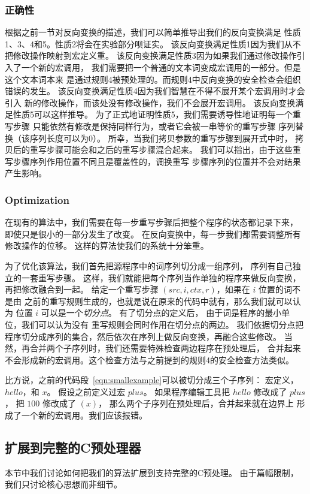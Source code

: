 \subsubsection{正确性}\label{sec:correctness}
根据之前一节对反向变换的描述，我们可以简单推导出我们的反向变换满足
性质1、3、4和5。性质2将会在实验部分呗证实。
该反向变换满足性质1因为我们从不把修改操作映射到宏定义重。
该反向变换满足性质3因为如果我们通过修改操作引入了一个新的宏调用，
我们需要把一个普通的文本词变成宏调用的一部分。但是这个文本词本来
是通过规则4被预处理的。而规则4中反向变换的安全检查会组织错误的发生。
该反向变换满足性质4因为我们智慧在不得不展开某个宏调用时才会引入
新的修改操作，而该处没有修改操作，我们不会展开宏调用。
该反向变换满足性质5可以这样推导。
为了正式地证明性质5，我们需要诱导性地证明每一个重写步骤
只能依然有修改是保持同样行为，或者它会被一串等价的重写步骤
序列替换（该序列长度可以为0）。
所幸，当我们拷贝参数的重写步骤到展开式中时，
拷贝后的重写步骤可能会和之后的重写步骤混合起来。
我们可以指出，由于这些重写步骤序列作用位置不同且是覆盖性的，调换重写
步骤序列的位置并不会对结果产生影响。

\subsubsection{Optimization}\label{sec:optimization}
在现有的算法中，我们需要在每一步重写步骤后把整个程序的状态都记录下来，
即使只是很小的一部分发生了改变。
在反向变换中，每一步我们都需要调整所有修改操作的位移。
这样的算法使我们的系统十分笨重。

为了优化该算法，我们首先把源程序中的词序列切分成一组序列，
序列有自己独立的一套重写步骤。
这样，我们就能把每个序列当作单独的程序来做反向变换，再把修改融合到一起。
给定一个重写步骤 $(src, i, ctx, r)$，如果在 $i$ 位置的词不是由
之前的重写规则生成的，也就是说在原来的代码中就有，那么我们就可以认为
位置 $i$ 可以是一个\emph{切分点}。
有了切分点的定义后， 由于词是程序的最小单位，我们可以认为没有
重写规则会同时作用在切分点的两边。
我们依据切分点把程序切分成序列的集合，然后依次在序列上做反向变换，再融合这些修改。
当然，再合并两个子序列时，我们还需要特殊检查两边程序在预处理后，
合并起来不会形成新的宏调用。这个检查方法与之前提到的规则4的安全检查方法类似。

比方说，之前的代码段~\ref{eqn:smallexample}可以被切分成三个子序列：
宏定义， $hello$，和 $x$。
假设之前定义过宏 $plus$。 如果程序编辑工具把 $hello$ 修改成了 $plus$，
把 $100$ 修改成了 $(x)$， 那么两个子序列在预处理后，合并起来就在边界上
形成了一个新的宏调用。我们应该报错。


\subsection{扩展到完整的C预处理器}\label{sec:fullC}
本节中我们讨论如何把我们的算法扩展到支持完整的C预处理。
由于篇幅限制，我们只讨论核心思想而非细节。

